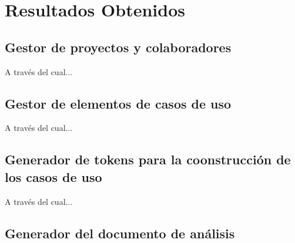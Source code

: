 \chapter{Resultados Obtenidos} \label{cap:nueve}

\section{Gestor de proyectos y colaboradores}

A través del cual...

\section{Gestor de elementos de casos de uso}

A través del cual...

\section{Generador de tokens para la coonstrucción de los casos de uso}

A través del cual...

\section{Generador del documento de análisis}
